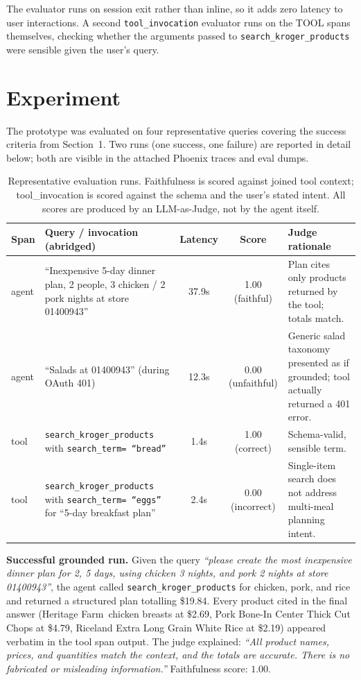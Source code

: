 \documentclass{article}
\begin{document}
The evaluator runs on session exit rather than inline, so it adds zero latency to user interactions. A second \texttt{tool\_invocation} evaluator runs on the TOOL spans themselves, checking whether the arguments passed to \texttt{search\_kroger\_products} were sensible given the user's query.

\FloatBarrier
\section{Experiment}
\label{sec:results}

The prototype was evaluated on four representative queries covering the success criteria from Section~1. Two runs (one success, one failure) are reported in detail below; both are visible in the attached Phoenix traces and eval dumps.

\begin{table}[!h]
\centering
\small
\caption{Representative evaluation runs. Faithfulness is scored against joined tool context; tool\_invocation is scored against the schema and the user's stated intent. All scores are produced by an LLM-as-Judge, not by the agent itself.}
\label{tab:results}
\begin{tabular}{@{}l>{\raggedright\arraybackslash}p{}cc>{\raggedright\arraybackslash}p{}@{}}
\toprule
\textbf{Span} & \textbf{Query / invocation (abridged)} & \textbf{Latency} & \textbf{Score} & \textbf{Judge rationale} \\
\midrule
agent & ``Inexpensive 5-day dinner plan, 2 people, 3 chicken / 2 pork nights at store 01400943'' & 37.9s & 1.00 (faithful) & Plan cites only products returned by the tool; totals match. \\
agent & ``Salads at 01400943'' (during OAuth 401) & 12.3s & 0.00 (unfaithful) & Generic salad taxonomy presented as if grounded; tool actually returned a 401 error. \\
tool & \texttt{search\_kroger\_products} with \texttt{search\_term=\,``bread''} & 1.4s & 1.00 (correct) & Schema-valid, sensible term. \\
tool & \texttt{search\_kroger\_products} with \texttt{search\_term=\,``eggs''} for ``5-day breakfast plan'' & 2.4s & 0.00 (incorrect) & Single-item search does not address multi-meal planning intent. \\
\bottomrule
\end{tabular}
\end{table}

\textbf{Successful grounded run.} Given the query \emph{``please create the most inexpensive dinner plan for 2, 5 days, using chicken 3 nights, and pork 2 nights at store 01400943''}, the agent called \texttt{search\_kroger\_products} for chicken, pork, and rice and returned a structured plan totalling \$19.84. Every product cited in the final answer (Heritage Farm\textregistered\ chicken breasts at \$2.69, Pork Bone-In Center Thick Cut Chops at \$4.79, Riceland Extra Long Grain White Rice at \$2.19) appeared verbatim in the tool span output. The judge explained: \emph{``All product names, prices, and quantities match the context, and the totals are accurate. There is no fabricated or misleading information.''} Faithfulness score: $\mathbf{1.00}$.
\end{document}
